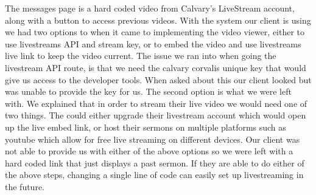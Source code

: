 \documentclass[letterpaper,10pt,draftclsnofoot,onecolumn,titlepage]{IEEEtran}
\begin{document}
		The messages page is a hard coded video from Calvary's LiveStream account, along with a button to access previous videos.
		With the system our client is using we had two options to when it came to implementing the video viewer, either to use livestreams API and stream key, or to embed the video and use livestreams live link to keep the video current.
		The issue we ran into when going the livestream API route, is that we need the calvary corvalis unique key that would give us access to the developer tools.
		When asked about this our client looked but was unable to provide the key for us.
		The second option is what we were left with.
		We explained that in order to stream their live video we would need one of two things.
		The could either upgrade their livestream account which would open up the live embed link, or host their sermons on multiple platforms such as youtube which allow for free live streaming on different devices.
		Our client was not able to provide us with either of the above options so we were left with a hard coded link that just displays a past sermon.
		If they are able to do either of the above steps, changing a single line of code can easily set up livestreaming in the future.
\end{document}
